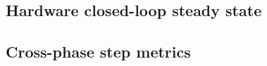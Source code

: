 \subsection{Hardware closed-loop steady state}

\FloatBarrier

\subsection{Cross-phase step metrics}



